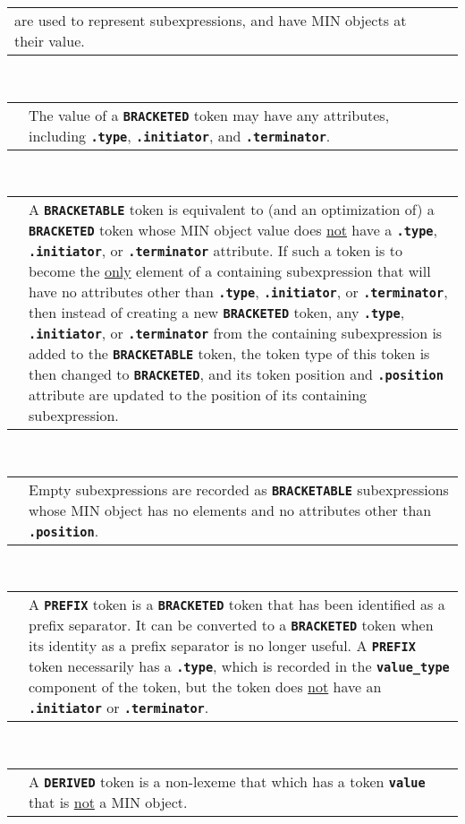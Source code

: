 \documentclass[12pt]{article}
\newcommand{\TT}[1]{{\tt \bfseries #1}}
\newenvironment{indpar}[1][0.3in]%
	{\begin{list}{}%
		     {\setlength{\itemsep}{0in}%
		      \setlength{\topsep}{0in}%
		      \setlength{\parsep}{1ex}%
		      \setlength{\labelwidth}{#1}%
		      \setlength{\leftmargin}{#1}%
		      \addtolength{\leftmargin}{\labelsep}}%
	 \item}%
	{\end{list}}
\begin{document}
\begin{indpar}
\begin{tabular}{p{1in}p{4.5in}}
		  are used to represent subexpressions, and have
		  MIN objects at their value.
\end{tabular}
\\[1ex]  
\begin{tabular}{p{1in}p{4.5in}}
		& The value of a \TT{BRACKETED} token may have
		  any attributes, including \TT{.type},
		  \TT{.initiator}, and \TT{.terminator}.
\end{tabular}
\\[1ex]  
\begin{tabular}{p{1in}p{4.5in}}
		& A \TT{BRACKETABLE} token
		  is equivalent to (and an optimization of) a \TT{BRACKETED}
		  token whose MIN object value does \underline{not} have
		  a \TT{.type}, \TT{.initiator}, or \TT{.terminator}
		  attribute.
		  If such a token is to become the \underline{only} element of a
		  containing subexpression that will have no attributes other
		  than \TT{.type}, \TT{.initiator}, or \TT{.terminator}, 
		  then instead of creating a new
		  \TT{BRACKETED} token, any \TT{.type}, \TT{.initiator},
		  or \TT{.terminator} from the containing subexpression
		  is added to the \TT{BRACKETABLE} token,
		  the token type of this token is then
		  changed to \TT{BRACKETED}, and
		  its token position and \TT{.position} attribute are
		  updated to the position of its containing subexpression.
\end{tabular}
\\[1ex]  
\begin{tabular}{p{1in}p{4.5in}}
		& Empty subexpressions are recorded as \TT{BRACKETABLE}
		  subexpressions whose MIN object has no elements and
		  no attributes other than \TT{.position}.
\end{tabular}
\\[1ex]
\begin{tabular}{p{1in}p{4.5in}}
		& A \TT{PREFIX} token is a
		  \TT{BRACKETED} token that has
		  been identified as a prefix separator.  It can be
		  converted to a \TT{BRACKETED} token when its identity
		  as a prefix separator is no longer useful.
		  A \TT{PREFIX} token necessarily has a \TT{.type},
		  which is recorded in
		  the \TT{value\_type} component of the token,
		  but the token does \underline{not} have an \TT{.initiator}
		  or \TT{.terminator}.
\end{tabular}
\\[1ex]
\begin{tabular}{p{1in}p{4.5in}}
		& A \TT{DERIVED} token is a non-lexeme that which has
		  a token \TT{value} that is \underline{not} a MIN object.

\end{tabular}
\end{indpar}
\end{document}
